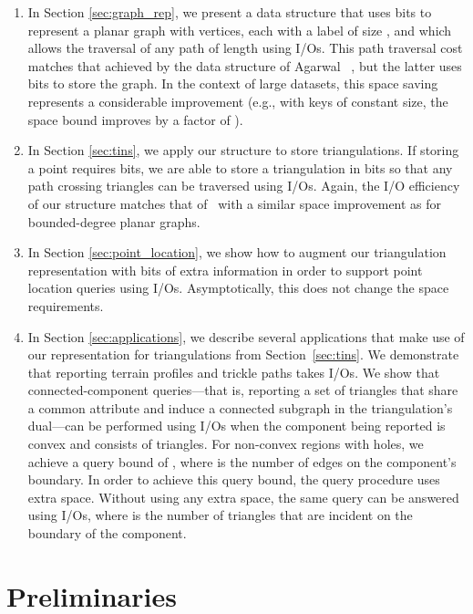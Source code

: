 \begin{enumerate}
\item In Section \ref{sec:graph_rep}, we present a data structure that
  uses  bits to represent a planar graph with 
  vertices, each with a label of size , and which allows the traversal of
  any path of length  using  I/Os.
  This path traversal cost matches that achieved by the data structure of
  Agarwal \etal~\cite{DBLP:conf/soda/AgarwalAMVV98}, but the latter
  uses  bits to store the graph.
  In the context of large datasets, this space saving represents a
  considerable improvement
  (e.g., with keys of constant size, the space bound improves by
  a factor of ).
\item In Section \ref{sec:tins}, we apply our structure to store
  triangulations.
  If storing a point requires  bits, we are able to store a triangulation in
   bits so that any path crossing 
  triangles can be traversed using  I/Os.
  Again, the I/O efficiency of our structure matches that
  of~\cite{DBLP:conf/soda/AgarwalAMVV98} with a similar space improvement
  as for bounded-degree planar graphs.
\item In Section \ref{sec:point_location}, we show how to
  augment our triangulation representation with  bits of extra
  information in order to support point location 
  queries using  I/Os.
  Asymptotically, this does not change the space requirements.
\item In Section \ref{sec:applications}, we describe several
  applications that make use of our representation for triangulations 
  from Section~\ref{sec:tins}.
  We demonstrate that reporting terrain profiles and trickle paths takes
   I/Os.
  We show that connected-component queries---that is, reporting a set of
  triangles that share a common attribute and induce a connected
  subgraph in the triangulation's dual---can be performed using
   I/Os when the component being reported is convex and consists
  of  triangles.
  For non-convex regions with holes, we achieve a query bound of
  , where  is the number
  of edges on the component's boundary.
  In order to achieve this query bound, the query procedure uses
   extra space.
  Without using any extra space, the same query can be answered using
   I/Os, where  is the number of
  triangles that are incident on the boundary of the component.
\end{enumerate}

\section{Preliminaries}


